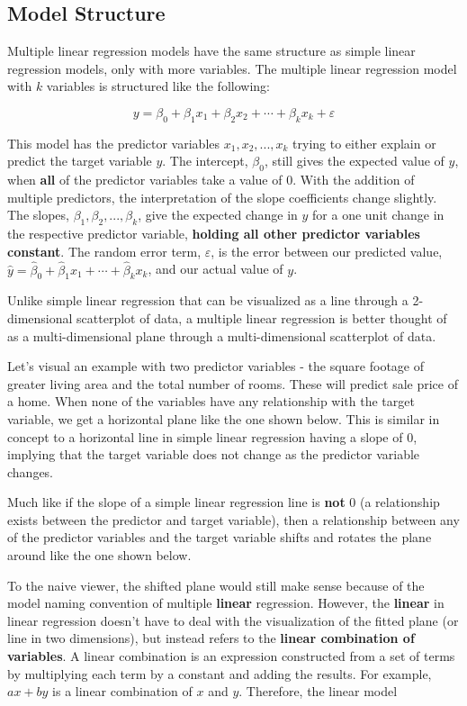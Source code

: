 \documentclass[
  letterpaper,
  DIV=11,
  numbers=noendperiod]{scrreprt}
\begin{document}
\hypertarget{model-structure}{%
\subsection{Model Structure}\label{model-structure}}

Multiple linear regression models have the same structure as simple
linear regression models, only with more variables. The multiple linear
regression model with \(k\) variables is structured like the following:

\[
y = \beta_0 + \beta_1 x_1 + \beta_2 x_2 + \cdots + \beta_k x_k + \varepsilon
\]

This model has the predictor variables \(x_1, x_2, ..., x_k\) trying to
either explain or predict the target variable \(y\). The intercept,
\(\beta_0\), still gives the expected value of \(y\), when \textbf{all}
of the predictor variables take a value of 0. With the addition of
multiple predictors, the interpretation of the slope coefficients change
slightly. The slopes, \(\beta_1, \beta_2, ..., \beta_k\), give the
expected change in \(y\) for a one unit change in the respective
predictor variable, \textbf{holding all other predictor variables
constant}. The random error term, \(\varepsilon\), is the error between
our predicted value,
\(\hat{y} = \hat{\beta}_0 + \hat{\beta}_1 x_1 + \cdots + \hat{\beta}_k x_k\),
and our actual value of \(y\).

Unlike simple linear regression that can be visualized as a line through
a 2-dimensional scatterplot of data, a multiple linear regression is
better thought of as a multi-dimensional plane through a
multi-dimensional scatterplot of data.

Let's visual an example with two predictor variables - the square
footage of greater living area and the total number of rooms. These will
predict sale price of a home. When none of the variables have any
relationship with the target variable, we get a horizontal plane like
the one shown below. This is similar in concept to a horizontal line in
simple linear regression having a slope of 0, implying that the target
variable does not change as the predictor variable changes.

Much like if the slope of a simple linear regression line is
\textbf{not} 0 (a relationship exists between the predictor and target
variable), then a relationship between any of the predictor variables
and the target variable shifts and rotates the plane around like the one
shown below.

To the naive viewer, the shifted plane would still make sense because of
the model naming convention of multiple \textbf{linear} regression.
However, the \textbf{linear} in linear regression doesn't have to deal
with the visualization of the fitted plane (or line in two dimensions),
but instead refers to the \textbf{linear combination of variables}. A
linear combination is an expression constructed from a set of terms by
multiplying each term by a constant and adding the results. For example,
\(ax + by\) is a linear combination of \(x\) and \(y\). Therefore, the
linear model
\end{document}
